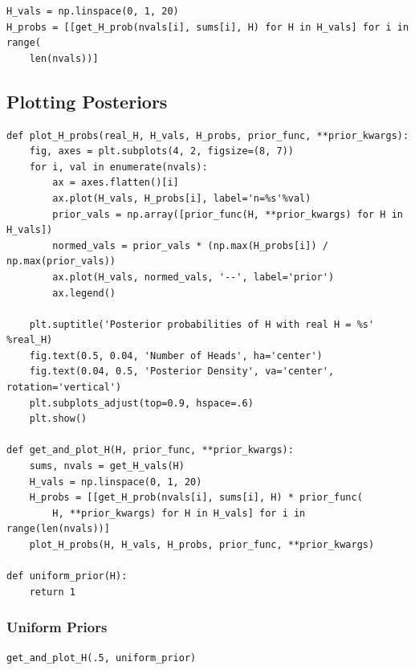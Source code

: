 \documentclass[11pt]{article}
\begin{document}
\begin{verbatim}
H_vals = np.linspace(0, 1, 20)
H_probs = [[get_H_prob(nvals[i], sums[i], H) for H in H_vals] for i in range(
    len(nvals))]
\end{verbatim}
\subsection*{Plotting Posteriors}
\label{sec-1-4}

\begin{verbatim}
def plot_H_probs(real_H, H_vals, H_probs, prior_func, **prior_kwargs):
    fig, axes = plt.subplots(4, 2, figsize=(8, 7))
    for i, val in enumerate(nvals):
        ax = axes.flatten()[i]
        ax.plot(H_vals, H_probs[i], label='n=%s'%val)
        prior_vals = np.array([prior_func(H, **prior_kwargs) for H in H_vals])
        normed_vals = prior_vals * (np.max(H_probs[i]) / np.max(prior_vals))
        ax.plot(H_vals, normed_vals, '--', label='prior')
        ax.legend()

    plt.suptitle('Posterior probabilities of H with real H = %s' %real_H)
    fig.text(0.5, 0.04, 'Number of Heads', ha='center')
    fig.text(0.04, 0.5, 'Posterior Density', va='center', rotation='vertical')
    plt.subplots_adjust(top=0.9, hspace=.6)
    plt.show()

def get_and_plot_H(H, prior_func, **prior_kwargs):
    sums, nvals = get_H_vals(H)
    H_vals = np.linspace(0, 1, 20)
    H_probs = [[get_H_prob(nvals[i], sums[i], H) * prior_func(
        H, **prior_kwargs) for H in H_vals] for i in range(len(nvals))]
    plot_H_probs(H, H_vals, H_probs, prior_func, **prior_kwargs)
    
def uniform_prior(H):
    return 1
\end{verbatim}

\subsubsection*{Uniform Priors}
\label{sec-1-4-1}

\begin{verbatim}
get_and_plot_H(.5, uniform_prior)
\end{verbatim}
\end{document}
